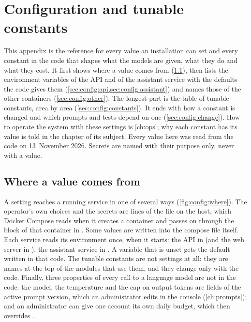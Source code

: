 \chapter{Configuration and tunable constants}\label{app:config}

This appendix is the reference for every value an installation can set and every constant in
the code that shapes what the models are given, what they do and what they cost. It first
shows where a value comes from (\cref{sec:config:where}), then lists the environment variables
of the API and of the assistant service with the defaults the code gives them
(\cref{sec:config:api,sec:config:assistant}) and names those of the other containers
(\cref{sec:config:other}). The longest part is the table of tunable constants, area by area
(\cref{sec:config:constants}). It ends with how a constant is changed and which prompts and
tests depend on one (\cref{sec:config:change}). How to operate the system with these settings
is \cref{ch:ops}; why each constant has its value is told in the chapter of its subject.
Every value here was read from the code on 13~November 2026. Secrets are named with their
purpose only, never with a value.


\section{Where a value comes from}\label{sec:config:where}

A setting reaches a running service in one of several ways (\cref{fig:config:where}). The
operator's own choices and the secrets are lines of the file  on the host, which
Docker Compose reads when it creates a container and passes on through the
 block of that container in . Some values are
written into the compose file itself. Each service reads its environment once, when it starts:
the API in  (and the web server in ), the
assistant service in . A variable that is unset gets the default written in
that code. The tunable constants are not settings at all: they are names at the top of the
modules that use them, and they change only with the code. Finally, three properties of every
call to a language model are not in the code: the model, the temperature and the cap on output tokens are
fields of the active prompt version, which an administrator edits in the console
(\cref{ch:prompts}); and an administrator can give one account its own daily budget, which
then overrides .

